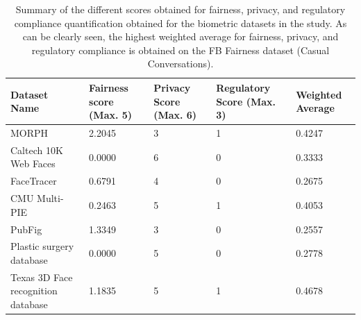 \documentclass[journal]{IEEEtran}
\begin{document}
\begin{table}[!t]
\caption{\label{tab:fprsummary}Summary of the different scores obtained for fairness, privacy, and regulatory compliance quantification obtained for the biometric datasets in the study. As can be clearly seen, the highest weighted average for fairness, privacy, and regulatory compliance is obtained on the FB Fairness dataset (Casual Conversations).}
\centering
\begin{tabular}{|p{}|C{0.11\textwidth}|C{0.11\textwidth}|C{0.11\textwidth}|C{0.11\textwidth}|}
\hline
\textbf{Dataset Name}                                                                    & \textbf{Fairness score (Max. 5)} & \textbf{Privacy Score (Max. 6)} & \textbf{Regulatory Score (Max. 3)} & \textbf{Weighted Average} \\ \hline
MORPH \cite{ricanek2006morph}                                                           & 2.2045                           & 3                               & 1                                  & 0.4247                    \\
Caltech 10K Web Faces \cite{caltech10kfaces}                                            & 0.0000                           & 6                               & 0                                  & 0.3333                    \\
FaceTracer \cite{kumar2008facetracer}                                                   & 0.6791                           & 4                               & 0                                  & 0.2675                    \\
CMU Multi-PIE \cite{ryan2009automated}                                                  & 0.2463                           & 5                               & 1                                  & 0.4053                    \\
PubFig \cite{kumar2009attribute}                                                        & 1.3349                           & 3                               & 0                                  & 0.2557                    \\
Plastic surgery database \cite{singh2010plastic}                                        & 0.0000                           & 5                               & 0                                  & 0.2778                    \\
Texas 3D Face recognition database \cite{gupta2010texas}                                & 1.1835                           & 5                               & 1                                  & 0.4678                    \\

\end{tabular}
\end{table}
\end{document}
